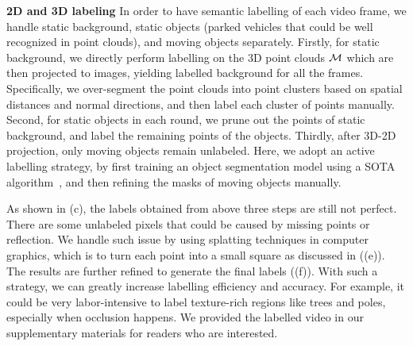 \textbf{2D and 3D labeling}
In order to have semantic labelling of each video frame, we handle static background, static objects (\eg parked vehicles that could be well recognized in point clouds), and moving objects separately.
Firstly, for static background, we directly perform labelling on the 3D point clouds ${\mathcal M}$ which are then projected to images, yielding labelled background for all the frames.
Specifically, we over-segment the point clouds into point clusters based on spatial distances and normal directions, and then label each cluster of points manually.
Second, for static objects in each round, we prune out the points of static background, and label the remaining points of the objects.
Thirdly, after 3D-2D projection, only moving objects remain unlabeled. Here, we adopt an active labelling strategy, by first training an object segmentation model using a SOTA algorithm~\cite{WuSH16e}, and then refining the masks of moving objects manually.

As shown in (c), the labels obtained from above three steps are still not perfect. There are some unlabeled pixels that could be caused by missing points or reflection. We handle such issue by using splatting techniques in computer graphics, which is to turn each point into a small square as discussed in  ((e)). The results are further refined to generate the final labels ((f)).
With such a strategy, we can greatly increase labelling efficiency and accuracy. For example, it could be very labor-intensive to label texture-rich regions like trees and poles, especially when occlusion happens.
We provided the labelled video in our supplementary materials for readers who are interested.

